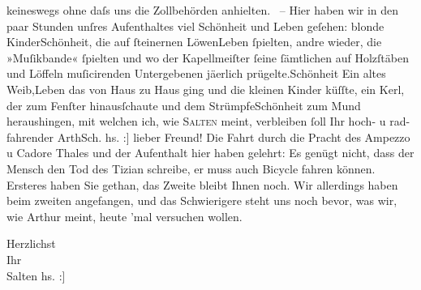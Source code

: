                keineswegs ohne daſs uns die Zollbehörden anhielten.  – Hier haben wir in den paar
               Stunden unſres Aufenthaltes viel Schönheit und Leben geſehen: blonde Kinder\noindent{}Schönheit, die auf ſteinernen Löwen\noindent{}Leben{ }ſpielten, andre wieder, die »Muſikbande« ſpielten
               und wo der Kapellmeiſter ſeine ſämtlichen auf {\pb}Holzſtäben
               und Löffeln muſicirenden Untergebenen jä{\geminationm}erlich
                  prügelte.\noindent{}Schönheit Ein altes Weib,\noindent{}Leben das von Haus zu Haus ging und die kleinen Kinder küſſte, ein Kerl, der zum
               Fenſter hinausſchaute und dem Strümpfe\noindent{}Schönheit zum Mund heraushingen, mit welchen ich, wie \textsc{Salten} meint, verbleiben ſoll\pend
           \pstart Ihr hoch- u rad-fahrender \spacefill\mbox{ArthSch.}\pend{}\vspace{1em}
\pstart
           \noindent{}{\pb}{[}hs. :{]} lieber Freund! Die Fahrt durch die Pracht des Ampezzo u Cadore Thales
               und der Aufenthalt hier haben gelehrt: Es genügt nicht, dass der Mensch den Tod des Tizian schreibe, er muss auch Bicycle
               fahren können. Ersteres haben Sie gethan, das Zweite bleibt Ihnen noch. Wir
               allerdings haben beim zweiten angefangen, und das Schwierigere steht uns noch bevor,
               was wir, wie Arthur meint, heute ’mal versuchen wollen.\pend
           
\pstart
           Herzlichst{\\}Ihr{\\}\spacefill\mbox{Salten}\pend
           \vspace{1em}
\pstart
           \noindent{}{[}hs. :{]} \label{T_L00259-1v}\label{T_L00259-1}\pend
           
